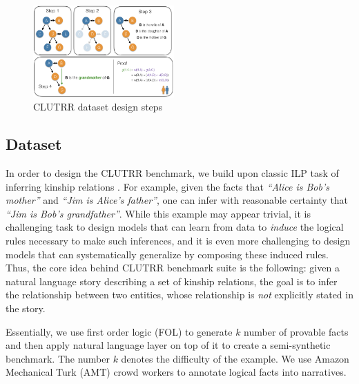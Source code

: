 \documentclass[12pt]{article}
\begin{document}
\begin{figure}
\begin{center}
  \includegraphics[width=0.48\textwidth]{images/clutrr_dataset_proof.png}
\end{center}
\caption{CLUTRR dataset design steps}
\label{fig:clutrr_data_design}
\end{figure}

\subsection{Dataset}

In order to design the CLUTRR benchmark, we build upon classic ILP task of inferring kinship relations \cite{hinton1986learning,muggleton1991inductive}. For example, given the facts that \textit{``Alice is Bob's mother''} and \textit{``Jim is Alice's father''}, one can infer with reasonable certainty that \textit{``Jim is Bob's grandfather''}. While this example may appear trivial, it is challenging task to design models that can learn from data to \textit{induce} the logical rules necessary to make such inferences, and it is even more challenging to design models that can systematically generalize by composing these induced rules. Thus, the core idea behind CLUTRR benchmark suite is the following: given a natural language story describing a set of kinship relations, the goal is to infer the relationship between two entities, whose relationship is \textit{not} explicitly stated in the story.

Essentially, we use first order logic (FOL) to generate $k$ number of provable facts and then apply natural language layer on top of it to create a semi-synthetic benchmark. The number $k$ denotes the difficulty of the example. We use Amazon Mechanical Turk (AMT) crowd workers to annotate logical facts into narratives.

\end{document}
